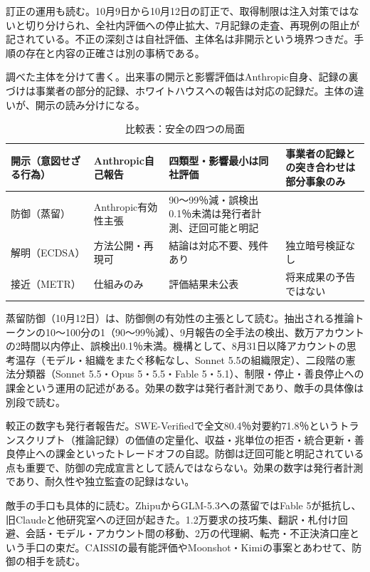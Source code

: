\documentclass[lualatex,a4paper,10pt]{jlreq}
\begin{document}
訂正の運用も読む。10月9日から10月12日の訂正で、取得制限は注入対策ではないと切り分けられ、全社内評価への停止拡大、7月記録の走査、再現例の阻止が記されている。不正の深刻さは自社評価、主体名は非開示という境界つきだ。手順の存在と内容の正確さは別の事柄である。
\cite{B40,B79}


調べた主体を分けて書く。出来事の開示と影響評価はAnthropic自身、記録の裏づけは事業者の部分的記録、ホワイトハウスへの報告は対応の記録だ。主体の違いが、開示の読み分けになる。
\cite{B40,B79}


\begin{table}[htbp]\centering\footnotesize
\caption{比較表：安全の四つの局面}
\begin{tabularx}{0.96\linewidth}{@{}lXXX@{}}
\toprule
開示（意図せざる行為） & Anthropic自己報告 & 四類型・影響最小は同社評価 & 事業者の記録との突き合わせは部分事象のみ \cite{B40,B79} \\
\midrule
防御（蒸留） & Anthropic有効性主張 & 90〜99％減・誤検出0.1％未満は発行者計測、迂回可能と明記 \cite{B41,B80} \\
\midrule
解明（ECDSA） & 方法公開・再現可 & 結論は対応不要、残件あり & 独立暗号検証なし \cite{B42,B81} \\
\midrule
接近（METR） & 仕組みのみ & 評価結果未公表 & 将来成果の予告ではない \cite{B39,B82} \\
\bottomrule
\end{tabularx}
\end{table}


蒸留防御（10月12日）は、防御側の有効性の主張として読む。抽出される推論トークンの10〜100分の1（90〜99％減）、9月報告の全手法の検出、数万アカウントの2時間以内停止、誤検出0.1％未満。機構として、8月31日以降アカウントの思考温存（モデル・組織をまたぐ移転なし、Sonnet 5.5の組織限定）、二段階の憲法分類器（Sonnet 5.5・Opus 5・5.5・Fable 5・5.1）、制限・停止・善良停止への課金という運用の記述がある。効果の数字は発行者計測であり、敵手の具体像は別段で読む。
\cite{B41,B80}


較正の数字も発行者報告だ。SWE-Verifiedで全文80.4％対要約71.8％というトランスクリプト（推論記録）の価値の定量化、収益・兆単位の拒否・統合更新・善良停止への課金といったトレードオフの自認。防御は迂回可能と明記されている点も重要で、防御の完成宣言として読んではならない。効果の数字は発行者計測であり、耐久性や独立監査の記録はない。
\cite{B41,B80}


敵手の手口も具体的に読む。ZhipuからGLM-5.3への蒸留ではFable 5が抵抗し、旧Claudeと他研究室への迂回が起きた。1.2万要求の技巧集、翻訳・札付け回避、会話・モデル・アカウント間の移動、2万の代理網、転売・不正決済口座という手口の束だ。CAISSIの最有能評価やMoonshot・Kimiの事案とあわせて、防御の相手を読む。
\cite{B41,B80}
\end{document}
